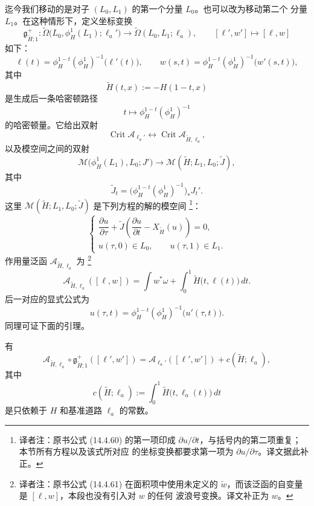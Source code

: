 迄今我们移动的是对子 $(L_0,L_1)$ 的第一个分量 $L_0$。也可以改为移动第二个
分量 $L_1$。在这种情形下，定义坐标变换
\[
  \mathfrak g_{\widetilde H;1}^+:
  \widetilde\Omega\bigl(L_0,\phi_H^1(L_1);\ell_a'\bigr)
  \longrightarrow
  \widetilde\Omega(L_0,L_1;\ell_a),
  \qquad
  [\ell',w']\longmapsto[\ell,w]
\]
如下：
\begin{equation}
  \ell(t)
  =
  \phi_H^{1-t}(\phi_H^1)^{-1}\bigl(\ell'(t)\bigr),
  \qquad
  w(s,t)
  =
  \phi_H^{1-t}(\phi_H^1)^{-1}\bigl(w'(s,t)\bigr),
\label{eq:coordinate-change-moving-lone}
\end{equation}
其中
\[
  \widetilde H(t,x):=-H(1-t,x)
\]
是生成后一条哈密顿路径
\[
  t\longmapsto\phi_H^{1-t}(\phi_H^1)^{-1}
\]
的哈密顿量。它给出双射
\[
  \operatorname{Crit}\mathcal A_{\ell_a'}
  \longleftrightarrow
  \operatorname{Crit}\mathcal A_{\widetilde H,\ell_a},
\]
以及模空间之间的双射
\[
  \mathcal M\bigl(\phi_H^1(L_1),L_0;J'\bigr)
  \longrightarrow
  \mathcal M(\widetilde H;L_1,L_0;\widetilde J),
\]
其中
\[
  \widetilde J_t
  =
  \bigl(\phi_H^{1-t}(\phi_H^1)^{-1}\bigr)_*J_t'.
\]
这里 $\mathcal M(\widetilde H;L_1,L_0;\widetilde J)$ 是下列方程的解的模空间
\footnote{译者注：原书公式 (14.4.60) 的第一项印成
$\partial u/\partial t$，与括号内的第二项重复；本节所有\personFloer{}方程以及该式所对应
的坐标变换都要求第一项为 $\partial u/\partial\tau$。译文据此补正。}：
\begin{equation}
  \begin{cases}
    \dfrac{\partial u}{\partial\tau}
    +
    \widetilde J
    \left(
      \dfrac{\partial u}{\partial t}
      -
      X_{\widetilde H}(u)
    \right)=0,\\[6pt]
    u(\tau,0)\in L_0,
    \qquad
    u(\tau,1)\in L_1.
  \end{cases}
\label{eq:moving-lone-dynamical-equation}
\end{equation}
作用量泛函 $\mathcal A_{\widetilde H,\ell_a}$ 为
\footnote{译者注：原书公式 (14.4.61) 在面积项中使用未定义的
$\widetilde w$，而该泛函的自变量是 $[\ell,w]$，本段也没有引入对 $w$ 的任何
波浪号变换。译文补正为 $w$。}
\begin{equation}
  \mathcal A_{\widetilde H,\ell_a}([\ell,w])
  =
  \int w^*\omega
  +
  \int_0^1\widetilde H\bigl(t,\ell(t)\bigr)\,dt.
\label{eq:moving-lone-action-functional}
\end{equation}
后一对应的显式公式为
\[
  u(\tau,t)
  =
  \phi_H^{1-t}(\phi_H^1)^{-1}\bigl(u'(\tau,t)\bigr).
\]
同理可证下面的引理。

\begin{lemma}
\label{lem:coordinate-change-action-shift-lone}
有
\begin{equation}
  \mathcal A_{\widetilde H,\ell_a}
  \circ\mathfrak g_{\widetilde H;1}^+([\ell',w'])
  =
  \mathcal A_{\ell_a'}([\ell',w'])
  +
  c(\widetilde H;\ell_a),
\label{eq:coordinate-change-action-shift-lone}
\end{equation}
其中
\[
  c(\widetilde H;\ell_a)
  :=
  \int_0^1\widetilde H\bigl(t,\ell_a(t)\bigr)\,dt
\]
是只依赖于 $H$ 和基准道路 $\ell_a$ 的常数。
\end{lemma}

